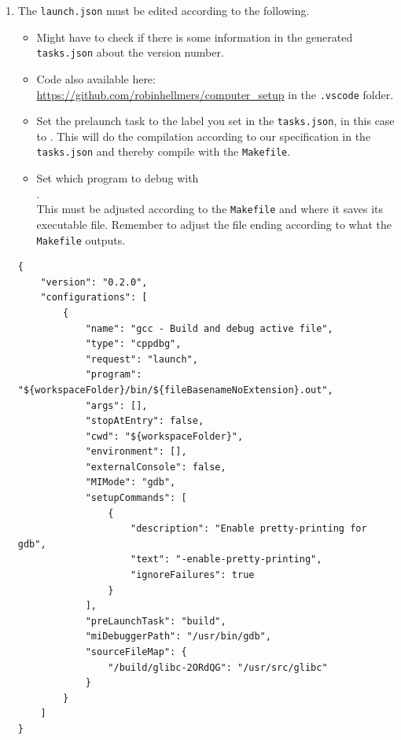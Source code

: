 \begin{enumerate}
    \newpage
    \item The \texttt{launch.json} must be edited according to the following.
    \begin{itemize}
        \item Might have to check if there is some information in the generated \texttt{tasks.json} about the version number.
        
        \item Code also available here: \url{https://github.com/robinhellmers/computer_setup} in the \texttt{.vscode} folder.
        
        \item Set the prelaunch task  to the label you set in the \texttt{tasks.json}, in this case to . This will do the compilation according to our specification in the \texttt{tasks.json} and thereby compile with the \texttt{Makefile}.
        
        \item Set which program to debug with\\.\\This must be adjusted according to the \texttt{Makefile} and where it saves its executable file. Remember to adjust the file ending according to what the \texttt{Makefile} outputs.
    \end{itemize}
    
\begin{verbatim}
{
    "version": "0.2.0",
    "configurations": [
        {
            "name": "gcc - Build and debug active file",
            "type": "cppdbg",
            "request": "launch",
            "program": "${workspaceFolder}/bin/${fileBasenameNoExtension}.out",
            "args": [],
            "stopAtEntry": false,
            "cwd": "${workspaceFolder}",
            "environment": [],
            "externalConsole": false,
            "MIMode": "gdb",
            "setupCommands": [
                {
                    "description": "Enable pretty-printing for gdb",
                    "text": "-enable-pretty-printing",
                    "ignoreFailures": true
                }
            ],
            "preLaunchTask": "build",
            "miDebuggerPath": "/usr/bin/gdb",
            "sourceFileMap": {
                "/build/glibc-2ORdQG": "/usr/src/glibc"
            }
        }
    ]
}
\end{verbatim}

\end{enumerate}

